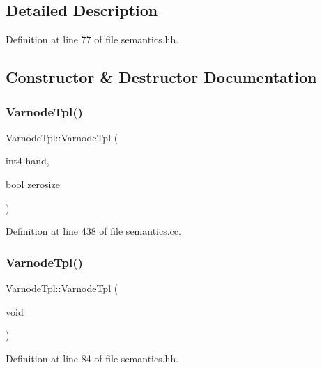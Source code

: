 \subsection{Detailed Description}


Definition at line 77 of file semantics.\+hh.



\subsection{Constructor \& Destructor Documentation}
\mbox{\label{class_varnode_tpl_ad569769b7b2b38750b2a7c95cdb0918c}} 
\subsubsection{\texorpdfstring{VarnodeTpl()}{VarnodeTpl()}\hspace{0.1cm}{\footnotesize\ttfamily [1/4]}}
{\footnotesize\ttfamily Varnode\+Tpl\+::\+Varnode\+Tpl (\begin{DoxyParamCaption}\item[{int4}]{hand,  }\item[{bool}]{zerosize }\end{DoxyParamCaption})}



Definition at line 438 of file semantics.\+cc.

\mbox{\label{class_varnode_tpl_acf006789c71e0140f4c9b23df12d49bb}} 
\subsubsection{\texorpdfstring{VarnodeTpl()}{VarnodeTpl()}\hspace{0.1cm}{\footnotesize\ttfamily [2/4]}}
{\footnotesize\ttfamily Varnode\+Tpl\+::\+Varnode\+Tpl (\begin{DoxyParamCaption}\item[{void}]{ }\end{DoxyParamCaption})\hspace{0.3cm}{\ttfamily [inline]}}



Definition at line 84 of file semantics.\+hh.

